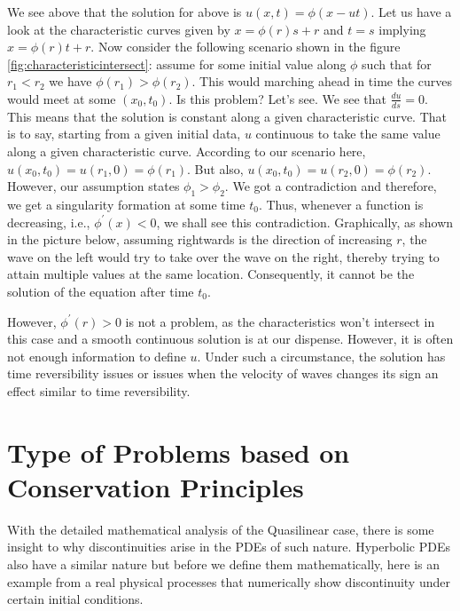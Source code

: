 \documentclass[11pt, a4paper]{report}
\begin{document}
We see above that the solution for above is $u(x, t) = \phi(x-ut)$. Let us have  a look at the characteristic
curves given by $x = \phi(r)s + r$ and $t = s$ implying $x = \phi(r)t + r$. Now consider the following scenario
shown in the figure \ref{fig:characteristicintersect}: assume for some initial value along $\phi$ such that for 
$r_1 < r_2$ we have $\phi(r_1) > \phi(r_2)$. This would marching ahead in time the curves would meet at some 
$(x_0, t_0)$. Is this problem? Let's see. We see that $\frac{du}{ds} = 0$. This means that the solution is constant 
along a given characteristic curve. That is to say, starting from a given initial data, $u$ continuous to take
the same value along a given characteristic curve. According to our scenario here, 
$u(x_0, t_0) = u(r_1, 0) = \phi(r_1)$. But also, $u(x_0, t_0) = u(r_2, 0) = \phi(r_2)$. However, our assumption 
states $\phi_1 > \phi_2$. We got a contradiction and therefore, we get a singularity formation at some time $t_0$. 
Thus, whenever a function is decreasing, i.e., $\phi^{\prime}(x)<0$, we shall see this contradiction. Graphically,
as shown in the picture below, assuming rightwards is the direction of increasing $r$, the wave on the left would 
try to take over the wave on the right, thereby trying to attain multiple values at the same location. Consequently, 
it cannot be the solution of the equation after time $t_0$. 

However, $\phi^{\prime}(r)>0$ is not a problem, as the characteristics won't intersect in this case and a smooth 
continuous solution is at our dispense. However, it is often not enough information to define $u$. Under such a
circumstance, the solution has time reversibility issues or issues when the velocity of waves changes its sign
\textemdash an effect similar to time reversibility.


\section{Type of Problems based on Conservation Principles}
With the detailed mathematical analysis of the Quasilinear case, there is some insight to why discontinuities 
arise in the PDEs of such nature. Hyperbolic PDEs also have a similar nature but before we define them mathematically,
here is an example from a real physical processes that numerically show discontinuity under certain initial conditions.
\end{document}
